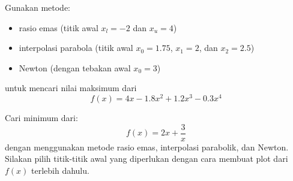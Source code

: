 \begin{soal}
Gunakan metode:
\begin{itemize}
\item rasio emas (titik awal $x_l = -2$ dan $x_u = 4$)
\item interpolasi parabola (titik awal $x_0 = 1.75$, $x_1 = 2$, dan $x_2 = 2.5$)
\item Newton (dengan tebakan awal $x_0 = 3$)
\end{itemize}
untuk mencari nilai maksimum dari
\begin{equation*}
f(x) = 4x - 1.8x^2 + 1.2x^3 - 0.3x^4
\end{equation*}
\end{soal}

\begin{soal}
Cari minimum dari:
\begin{equation*}
f(x) = 2x + \frac{3}{x}
\end{equation*}
dengan menggunakan metode rasio emas, interpolasi parabolik, dan Newton.
Silakan pilih titik-titik awal yang diperlukan dengan cara membuat plot
dari $f(x)$ terlebih dahulu.
\end{soal}

